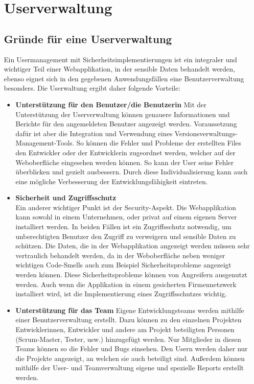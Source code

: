 \section{Userverwaltung}
\subsection{Gründe für eine Userverwaltung}
Ein Usermanagement mit Sicherheitsimplementierungen ist ein integraler und wichtiger Teil einer Webapplikation, in der sensible Daten behandelt werden, ebenso eignet sich in den gegebenen Anwendungsfällen eine Benutzerverwaltung besonders. Die Userwaltung ergibt daher folgende Vorteile:
\begin{itemize} 
  \item \textbf{Unterstützung für den Benutzer/die Benutzerin} 
Mit der Unterstützung der Userverwaltung können genauere Informationen und Berichte für den angemeldeten Benutzer angezeigt werden. Voraussetzung dafür ist aber die Integration und Verwendung eines Versionsverwaltungs-Management-Tools. So können die Fehler und Probleme der erstellten Files den Entwickler oder der Entwicklerin zugeordnet werden, welcher auf der Weboberfläche eingesehen werden können. So kann der User seine Fehler überblicken und gezielt ausbessern. Durch diese Individualisierung kann auch eine mögliche Verbesserung der Entwicklungsfähigkeit eintreten.  
    \item \textbf{Sicherheit und Zugriffsschutz} \\ Ein anderer wichtiger Punkt ist der Security-Aspekt. Die Webapplikation kann sowohl in einem Unternehmen, oder privat auf einem eigenen Server installiert werden. In beiden Fällen ist ein Zugriffsschutz notwendig, um unberechtigten Benutzer den Zugriff zu verweigern und sensible Daten zu schützen. Die Daten, die in der Webapplikation angezeigt werden müssen sehr vertraulich behandelt werden, da in der Weboberfläche neben weniger wichtigen Code-Smells auch zum Beispiel Sicherheitsprobleme angezeigt werden können. Diese Sicherheitsprobleme können von Angreifern ausgenutzt werden. Auch wenn die Applikation in einem gesicherten Firmennetzwerk installiert wird, ist die Implementierung eines Zugriffsschutzes wichtig. 
\item \textbf{Unterstützung für das Team}
Eigene Entwicklungsteams werden mithilfe einer Benutzerverwaltung erstellt. Dazu können zu den einzelnen Projekten Entwicklerinnen, Entwickler und andere am Projekt beteiligten Personen (Scrum-Master, Tester, usw.) hinzugefügt werden. Nur Mitglieder in diesen Teams können so die Fehler und Bugs einsehen. Den Usern werden daher nur die Projekte angezeigt, an welchen sie auch beteiligt sind. Außerdem können mithilfe der User- und Teamverwaltung eigene und spezielle Reports erstellt werden.
\end{itemize}

